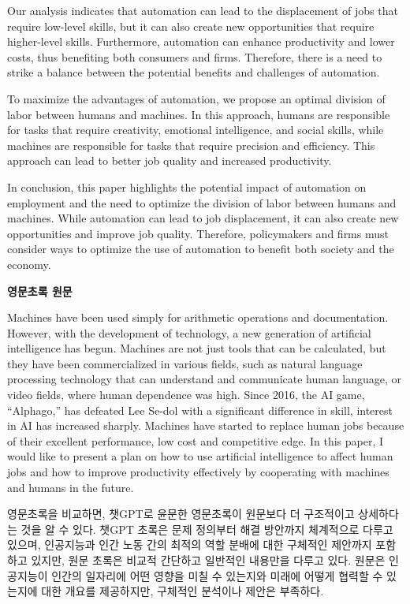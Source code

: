 \documentclass[
  letterpaper,
]{book}
\begin{document}
Our analysis indicates that automation can lead to the displacement of
jobs that require low-level skills, but it can also create new
opportunities that require higher-level skills. Furthermore, automation
can enhance productivity and lower costs, thus benefiting both consumers
and firms. Therefore, there is a need to strike a balance between the
potential benefits and challenges of automation.

To maximize the advantages of automation, we propose an optimal division
of labor between humans and machines. In this approach, humans are
responsible for tasks that require creativity, emotional intelligence,
and social skills, while machines are responsible for tasks that require
precision and efficiency. This approach can lead to better job quality
and increased productivity.

In conclusion, this paper highlights the potential impact of automation
on employment and the need to optimize the division of labor between
humans and machines. While automation can lead to job displacement, it
can also create new opportunities and improve job quality. Therefore,
policymakers and firms must consider ways to optimize the use of
automation to benefit both society and the economy.

\textbf{영문초록 원문}

Machines have been used simply for arithmetic operations and
documentation. However, with the development of technology, a new
generation of artificial intelligence has begun. Machines are not just
tools that can be calculated, but they have been commercialized in
various fields, such as natural language processing technology that can
understand and communicate human language, or video fields, where human
dependence was high. Since 2016, the AI game, ``Alphago,'' has defeated
Lee Se-dol with a significant difference in skill, interest in AI has
increased sharply. Machines have started to replace human jobs because
of their excellent performance, low cost and competitive edge. In this
paper, I would like to present a plan on how to use artificial
intelligence to affect human jobs and how to improve productivity
effectively by cooperating with machines and humans in the future.

영문초록을 비교하면, 챗GPT로 윤문한 영문초록이 원문보다 더 구조적이고
상세하다는 것을 알 수 있다. 챗GPT 초록은 문제 정의부터 해결 방안까지
체계적으로 다루고 있으며, 인공지능과 인간 노동 간의 최적의 역할 분배에
대한 구체적인 제안까지 포함하고 있지만, 원문 초록은 비교적 간단하고
일반적인 내용만을 다루고 있다. 원문은 인공지능이 인간의 일자리에 어떤
영향을 미칠 수 있는지와 미래에 어떻게 협력할 수 있는지에 대한 개요를
제공하지만, 구체적인 분석이나 제안은 부족하다.
\end{document}

